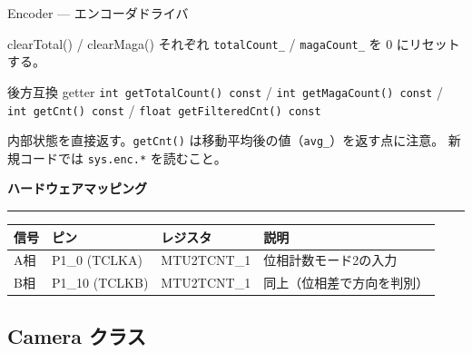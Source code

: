 \documentclass[a4paper,11pt,dvipdfmx]{jsarticle}
\makeatletter
\newcommand{\apisection}[1]{%
  \par\addvspace{4mm}%
  {\normalsize\bfseries\color{headerblue} #1}%
  \par\vspace{-1mm}%
  {\color{accentblue!40}\rule{\linewidth}{0.5pt}}%
  \par\nobreak\vspace{2mm}%
  \@afterheading
}
\makeatother
\begin{document}
\begin{apibox}{Encoder --- エンコーダドライバ}
\begin{funcblock}{clearTotal() / clearMaga()}
\vspace{1.5mm}
それぞれ \texttt{totalCount\_} / \texttt{magaCount\_} を 0 にリセットする。
\end{funcblock}

\begin{funcblock}{後方互換 getter}
\texttt{int getTotalCount() const} / \texttt{int getMagaCount() const} /
\texttt{int getCnt() const} / \texttt{float getFilteredCnt() const}

\vspace{1.5mm}
内部状態を直接返す。\texttt{getCnt()} は移動平均後の値（\texttt{avg\_}）を返す点に注意。
新規コードでは \texttt{sys.enc.*} を読むこと。
\end{funcblock}

\apisection{ハードウェアマッピング}

\begin{tabularx}{\textwidth}{l l l X}
\toprule
\textbf{信号} & \textbf{ピン} & \textbf{レジスタ} & \textbf{説明} \\
\midrule
A相 & P1\_0  (TCLKA) & MTU2TCNT\_1 & 位相計数モード2の入力 \\
B相 & P1\_10 (TCLKB) & MTU2TCNT\_1 & 同上（位相差で方向を判別） \\
\bottomrule
\end{tabularx}

\end{apibox}

\subsection{Camera クラス}\label{sec:api-camera}
\end{document}
